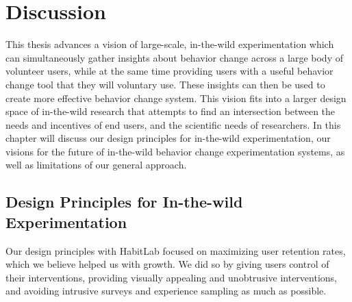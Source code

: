 \chapter{Discussion}



This thesis advances a vision of large-scale, in-the-wild experimentation which can simultaneously gather insights about behavior change across a large body of volunteer users, while at the same time providing users with a useful behavior change tool that they will voluntary use. These insights can then be used to create more effective behavior change system. This vision fits into a larger design space of in-the-wild research that attempts to find an intersection between the needs and incentives of end users, and the scientific needs of researchers. In this chapter will discuss our design principles for in-the-wild experimentation, our visions for the future of in-the-wild behavior change experimentation systems, as well as limitations of our general approach.

\section{Design Principles for In-the-wild Experimentation}

Our design principles with HabitLab focused on maximizing user retention rates, which we believe helped us with growth. We did so by giving users control of their interventions, providing visually appealing and unobtrusive interventions, and avoiding intrusive surveys and experience sampling as much as possible.


